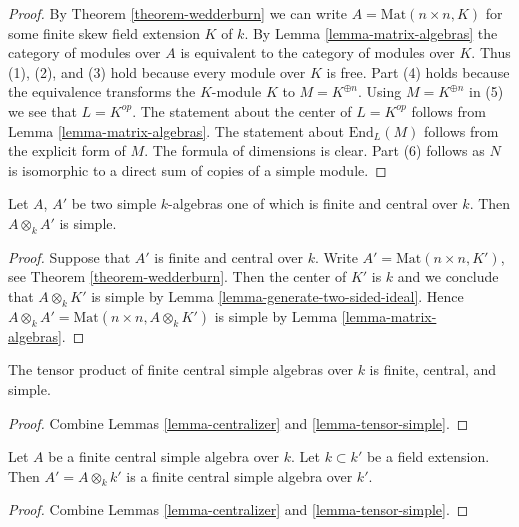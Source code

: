 \begin{proof}
By
Theorem \ref{theorem-wedderburn}
we can write $A = \text{Mat}(n \times n, K)$ for some finite skew
field extension $K$ of $k$. By
Lemma \ref{lemma-matrix-algebras}
the category of modules over $A$ is equivalent to the category of
modules over $K$. Thus (1), (2), and (3) hold
because every module over $K$ is free. Part (4) holds
because the equivalence transforms the $K$-module $K$
to $M = K^{\oplus n}$. Using $M = K^{\oplus n}$ in (5)
we see that $L = K^{op}$. The statement about the center of $L = K^{op}$
follows from
Lemma \ref{lemma-matrix-algebras}.
The statement about $\text{End}_L(M)$ follows from the explicit form
of $M$. The formula of dimensions is clear.
Part (6) follows as $N$ is isomorphic to a direct sum of
copies of a simple module.
\end{proof}

\begin{lemma}
\label{lemma-tensor-simple}
Let $A$, $A'$ be two simple $k$-algebras one of which is finite and central
over $k$. Then $A \otimes_k A'$ is simple.
\end{lemma}

\begin{proof}
Suppose that $A'$ is finite and central over $k$.
Write $A' = \text{Mat}(n \times n, K')$, see
Theorem \ref{theorem-wedderburn}.
Then the center of $K'$ is $k$ and we conclude that
$A \otimes_k K'$ is simple by
Lemma \ref{lemma-generate-two-sided-ideal}.
Hence $A \otimes_k A' = \text{Mat}(n \times n, A \otimes_k K')$ is simple
by Lemma \ref{lemma-matrix-algebras}.
\end{proof}

\begin{lemma}
\label{lemma-tensor-central-simple}
The tensor product of finite central simple algebras over $k$ is finite,
central, and simple.
\end{lemma}

\begin{proof}
Combine Lemmas \ref{lemma-centralizer} and \ref{lemma-tensor-simple}.
\end{proof}

\begin{lemma}
\label{lemma-base-change}
Let $A$ be a finite central simple algebra over $k$.
Let $k \subset k'$ be a field extension. Then $A' = A \otimes_k k'$ is
a finite central simple algebra over $k'$.
\end{lemma}

\begin{proof}
Combine Lemmas \ref{lemma-centralizer} and \ref{lemma-tensor-simple}.
\end{proof}

